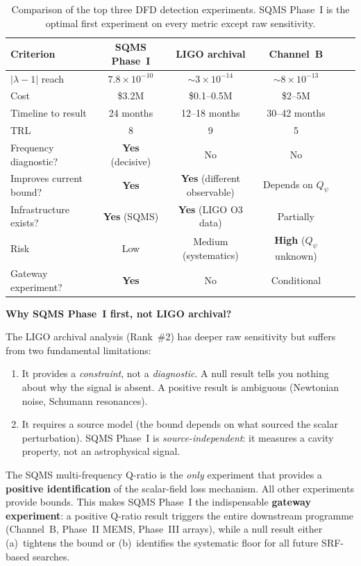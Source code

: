 \documentclass[11pt]{article}
\newcommand{\lbone}{|\lambda - 1|}
\newcommand{\Qpsi}{Q_\psi}
\newcommand{\ee}[1]{\times 10^{#1}}
\begin{document}
\begin{table}[H]
\centering
\caption{Comparison of the top three DFD detection experiments.
SQMS Phase~I is the optimal first experiment on every metric except
raw sensitivity.}
\label{tab:comparison}
\renewcommand{\arraystretch}{1.3}
\begin{tabular}{@{}p{3cm}ccccc@{}}
\toprule
\textbf{Criterion} & \textbf{SQMS Phase~I} & \textbf{LIGO archival} &
  \textbf{Channel~B} \\
\midrule
$\lbone$ reach & $7.8\ee{-10}$ & $\sim 3\ee{-14}$ &
  $\sim 8\ee{-13}$ \\
Cost & \$3.2M & \$0.1--0.5M & \$2--5M \\
Timeline to result & 24 months & 12--18 months & 30--42 months \\
TRL & 8 & 9 & 5 \\
Frequency diagnostic? & \textbf{Yes} (decisive) & No & No \\
Improves current bound? & \textbf{Yes} & \textbf{Yes} (different observable) &
  Depends on $\Qpsi$ \\
Infrastructure exists? & \textbf{Yes} (SQMS) & \textbf{Yes} (LIGO O3 data) &
  Partially \\
Risk & Low & Medium (systematics) & \textbf{High} ($\Qpsi$ unknown) \\
Gateway experiment? & \textbf{Yes} & No & Conditional \\
\bottomrule
\end{tabular}
\end{table}

\textbf{Why SQMS Phase~I first, not LIGO archival?}

The LIGO archival analysis (Rank~\#2) has deeper raw sensitivity but
suffers from two fundamental limitations:
\begin{enumerate}[nosep]
\item It provides a \textit{constraint}, not a \textit{diagnostic}.
  A null result tells you nothing about why the signal is absent.
  A positive result is ambiguous (Newtonian noise, Schumann resonances).
\item It requires a source model (the bound depends on what sourced the
  scalar perturbation). SQMS Phase~I is \textit{source-independent}: it
  measures a cavity property, not an astrophysical signal.
\end{enumerate}

The SQMS multi-frequency Q-ratio is the \textit{only} experiment that
provides a \textbf{positive identification} of the scalar-field loss
mechanism. All other experiments provide bounds. This makes SQMS
Phase~I the indispensable \textbf{gateway experiment}: a positive
Q-ratio result triggers the entire downstream programme (Channel~B,
Phase~II MEMS, Phase~III arrays), while a null result either
(a)~tightens the bound or (b)~identifies the systematic floor for all
future SRF-based searches.
\end{document}
